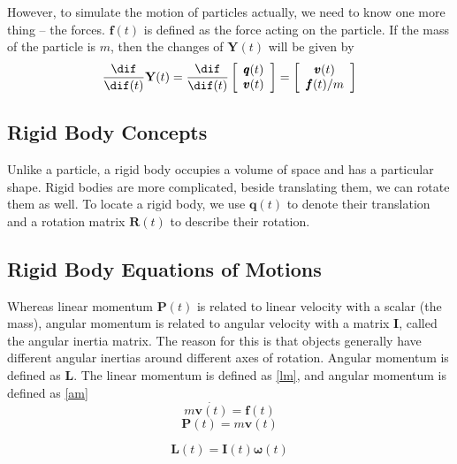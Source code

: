 However, to simulate the motion of particles actually, we need to know one more thing -- the forces. $\pmb{f}(t)$ is defined as the force acting on the particle. If the mass of the particle is $m$, then the changes of $\textbf{Y}(t)$ will be given by
\begin{equation}
    \frac{\dif}{\dif(t)}\textbf{Y}(t) = \frac{\dif}{\dif(t)}\left[
        \begin{array}{c}
            \pmb{q}(t) \\
            \pmb{v}(t) \\
        \end{array} \right] = \left[
        \begin{array}{c}
            \pmb{v}(t) \\
            \pmb{f}(t)/m \\
        \end{array} \right]
\end{equation}

\subsection{Rigid Body Concepts}
Unlike a particle, a rigid body occupies a volume of space and has a particular shape. Rigid bodies are more complicated, beside translating them, we can rotate them as well. To locate a rigid body, we use $\pmb{q}(t)$ to denote their translation and a rotation matrix $\pmb{R}(t)$ to describe their rotation.

\subsection{Rigid Body Equations of Motions}
\label{sec:rigid_rm}
 Whereas linear momentum $\pmb{P}(t)$ is related to linear velocity with a scalar (the mass), angular momentum is related to angular velocity with a matrix \(\pmb{I}\), called the angular inertia matrix. The reason for this is that objects generally have different angular inertias around different axes of rotation. Angular momentum is defined as \(\pmb{L}\). The linear momentum is defined as \ref{lm}, and angular momentum is defined as \ref{am}
\begin{equation}
    m \dot{\pmb{v}(t)} = \pmb{f}(t)
    \label{force}
\end{equation}
\begin{equation}
    \pmb{P}(t) = m \pmb{v} (t)
    \label{lm}
\end{equation}

\begin{equation}
    \pmb{L}(t) = \pmb{I}(t)\pmb{\omega}(t)
    \label{am}
\end{equation}

